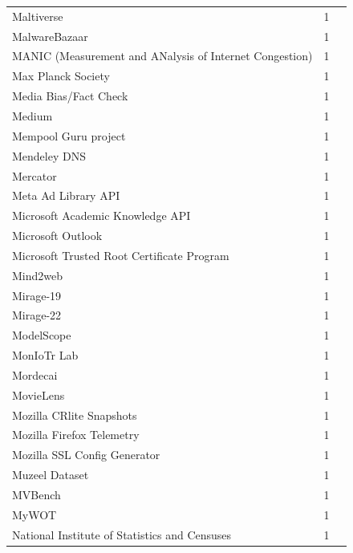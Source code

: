 \documentclass[11pt,a4paper]{article}
\begin{document}
\begin{longtable}{@{}p{} p{}p{}@{}}
Maltiverse & 1 & \cite{10.1145/3777912.3839790} \\
MalwareBazaar & 1 & \cite{10.1145/3517745.3561463} \\
MANIC (Measurement and ANalysis of Internet Congestion) & 1 & \cite{10.1007/978-3-030-98785-5_7} \\
Max Planck Society & 1 & \cite{10.1007/978-3-032-18268-5_5} \\
Media Bias/Fact Check  & 1 & \cite{10.1145/3487552.3487859} \\
Medium & 1 & \cite{10.1145/3777912.3809150} \\
Mempool Guru project & 1 & \cite{10.1145/3618257.3624824} \\
Mendeley DNS & 1 & \cite{10.1145/3777912.3839801} \\
Mercator & 1 & \cite{10.1145/3487552.3487812} \\
Meta Ad Library API & 1 & \cite{10.1145/3646547.3689020} \\
Microsoft Academic Knowledge API & 1 & \cite{10.1145/3487552.3487821} \\
Microsoft Outlook & 1 & \cite{10.1145/3487552.3487839} \\
Microsoft Trusted Root Certificate Program & 1 & \cite{10.1145/3646547.3688415} \\
Mind2web & 1 & \cite{10.1145/3777912.3839788} \\
Mirage-19 & 1 & \cite{10.1007/978-3-031-56249-5_7} \\
Mirage-22 & 1 & \cite{10.1007/978-3-031-56249-5_7} \\
ModelScope & 1 & \cite{10.1145/3777912.3839799} \\
MonIoTr Lab & 1 & \cite{10.1145/3618257.3624830} \\
Mordecai & 1 & \cite{10.1145/3618257.3624816} \\
MovieLens & 1 & \cite{10.1145/3618257.3624823} \\
Mozilla CRlite Snapshots & 1 & \cite{10.1145/3777912.3839820} \\
Mozilla Firefox Telemetry & 1 & \cite{10.1145/3777912.3839820} \\
Mozilla SSL Config Generator & 1 & \cite{10.1007/978-3-031-28486-1_6} \\
Muzeel Dataset & 1 & \cite{10.1145/3777912.3839817} \\
MVBench & 1 & \cite{10.1145/3777912.3839793} \\
MyWOT & 1 & \cite{10.1145/3777912.3839791} \\
National Institute of Statistics and Censuses & 1 & \cite{10.1007/978-3-032-18268-5_4} \\

\end{longtable}
\end{document}
